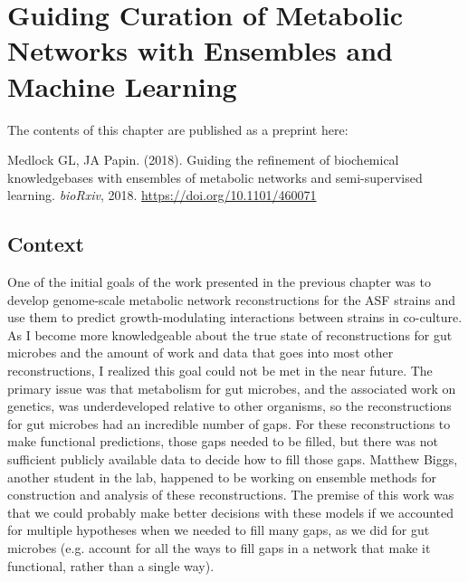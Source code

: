 \documentclass[11pt,onecolumn,notitlepage,openany,twoside]{book}
\begin{document}
\chapter{Guiding Curation of Metabolic Networks with Ensembles and Machine Learning}
\begin{refsection}

The contents of this chapter are published as a preprint here:

\medskip\noindent
Medlock GL, JA Papin. (2018). Guiding the refinement of biochemical knowledgebases with ensembles of metabolic networks and semi-supervised learning. \textit{bioRxiv}, 2018. \url{https://doi.org/10.1101/460071}


\section{Context}

One of the initial goals of the work presented in the previous chapter was to develop genome-scale metabolic network reconstructions for the ASF strains and use them to predict growth-modulating interactions between strains in co-culture. As I become more knowledgeable about the true state of reconstructions for gut microbes and the amount of work and data that goes into most other reconstructions, I realized this goal could not be met in the near future. The primary issue was that metabolism for gut microbes, and the associated work on genetics, was underdeveloped relative to other organisms, so the reconstructions for gut microbes had an incredible number of gaps. For these reconstructions to make functional predictions, those gaps needed to be filled, but there was not sufficient publicly available data to decide how to fill those gaps. Matthew Biggs, another student in the lab, happened to be working on ensemble methods for construction and analysis of these reconstructions. The premise of this work was that we could probably make better decisions with these models if we accounted for multiple hypotheses when we needed to fill many gaps, as we did for gut microbes (e.g. account for all the ways to fill gaps in a network that make it functional, rather than a single way).


\end{refsection}
\end{document}
